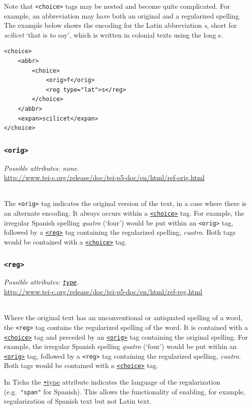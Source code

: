 \documentclass[12pt,a4paper]{article}
\newcommand{\taglinks}[2]{
\vspace*{-0.5ex}
\hspace*{\parindent}
\begin{minipage}{\textwidth}
  \emph{Possible attributes: #1.} \\ \url{#2} \end{minipage} \vspace{0.5ex} \\ }
\begin{document}
Note that \texttt{<choice>} tags may be nested and become quite complicated.  For example, an abbreviation may have both an original and a regularized spelling.  The example below shows the encoding for the Latin abbreviation \emph{s}, short for \emph{scilicet} `that is to say', which is written in colonial texts using the long s.

\begin{lstlisting}
<choice>
	<abbr>
		<choice>
			<orig>f</orig>
			<reg type="lat">s</reg>
		</choice>
	</abbr>
	<expan>scilicet</expan>
</choice>
\end{lstlisting}


\subsubsection{\texttt{<orig>}} \label{tag-sec:orig}
\taglinks{none}
{http://www.tei-c.org/release/doc/tei-p5-doc/en/html/ref-orig.html}
The \texttt{<orig>} tag indicates the original version of the text, in a case where there is an alternate encoding.  It always occurs within a \hyperref[tag-sec:choice]{\texttt{<choice>}} tag.  For example, the irregular Spanish spelling \emph{quatro} (`four') would be put within an \texttt{<orig>} tag, followed by a \hyperref[tag-sec:reg]{\texttt{<reg>}} tag containing the regularized spelling, \emph{cuatro}.  Both tags would be contained with a \hyperref[tag-sec:choice]{\texttt{<choice>}} tag.

\subsubsection{\texttt{<reg>}} \label{tag-sec:reg}
\taglinks{\hyperref[att-sec:type]{\texttt{type}}}
{http://www.tei-c.org/release/doc/tei-p5-doc/en/html/ref-reg.html}
Where the original text has an unconventional or antiquated spelling of a word, the \texttt{<reg>} tag contains the regularized spelling of the word.  It is contained with a \hyperref[tag-sec:choice]{\texttt{<choice>}} tag and preceded by an \hyperref[tag-sec:orig]{\texttt{<orig>}} tag containing the original spelling.  For example, the irregular Spanish spelling \emph{quatro} (`four') would be put within an \hyperref[tag-sec:orig]{\texttt{<orig>}} tag, followed by a \texttt{<reg>} tag containing the regularized spelling, \emph{cuatro}.  Both tags would be contained with a \hyperref[tag-sec:choice]{\texttt{<choice>}} tag.

In Ticha the \hyperref[att-sec:type]{\texttt{•}{type}} attribute indicates the language of the regularization (e.g.\ \texttt{"span"} for Spanish).  This allows the functionality of enabling, for example, regularization of Spanish text but not Latin text.
\end{document}
